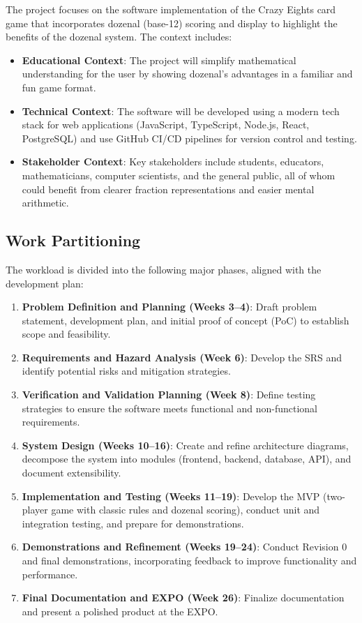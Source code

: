 \documentclass[12pt]{article}
\begin{document}
The project focuses on the software implementation of the Crazy Eights card game that incorporates dozenal (base-12) scoring and display to highlight the benefits of the dozenal system. The context includes:

\begin{itemize}
    \item \textbf{Educational Context}: The project will simplify mathematical understanding for the user by showing dozenal's advantages in a familiar and fun game format.
    \item \textbf{Technical Context}: The software will be developed using a modern tech stack for web applications (JavaScript, TypeScript, Node.js, React, PostgreSQL) and use GitHub CI/CD pipelines for version control and testing.
    \item \textbf{Stakeholder Context}: Key stakeholders include students, educators, mathematicians, computer scientists, and the general public, all of whom could benefit from clearer fraction representations and easier mental arithmetic.
\end{itemize}

\subsection{Work Partitioning}

The workload is divided into the following major phases, aligned with the development plan:

\begin{enumerate}
    \item \textbf{Problem Definition and Planning (Weeks 3--4)}: Draft problem statement, development plan, and initial proof of concept (PoC) to establish scope and feasibility.
    \item \textbf{Requirements and Hazard Analysis (Week 6)}: Develop the SRS and identify potential risks and mitigation strategies.
    \item \textbf{Verification and Validation Planning (Week 8)}: Define testing strategies to ensure the software meets functional and non-functional requirements.
    \item \textbf{System Design (Weeks 10--16)}: Create and refine architecture diagrams, decompose the system into modules (frontend, backend, database, API), and document extensibility.
    \item \textbf{Implementation and Testing (Weeks 11--19)}: Develop the MVP (two-player game with classic rules and dozenal scoring), conduct unit and integration testing, and prepare for demonstrations.
    \item \textbf{Demonstrations and Refinement (Weeks 19--24)}: Conduct Revision 0 and final demonstrations, incorporating feedback to improve functionality and performance.
    \item \textbf{Final Documentation and EXPO (Week 26)}: Finalize documentation and present a polished product at the EXPO.
\end{enumerate}
\end{document}
